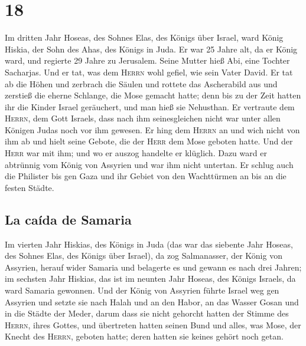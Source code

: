 \hypertarget{section-17}{%
\section{18}\label{section-17}}

 Im dritten Jahr Hoseas, des Sohnes Elas, des Königs über
Israel, ward König Hiskia, der Sohn des Ahas, des Königs in Juda.
 Er war 25 Jahre alt, da er König ward, und regierte 29
Jahre zu Jerusalem. Seine Mutter hieß Abi, eine Tochter Sacharjas.
 Und er tat, was dem \textsc{Herrn} wohl gefiel, wie sein
Vater David.  Er tat ab die Höhen und zerbrach die Säulen
und rottete das Ascherabild aus und zerstieß die eherne Schlange, die
Mose gemacht hatte; denn bis zu der Zeit hatten ihr die Kinder Israel
geräuchert, und man hieß sie Nehusthan.  Er vertraute dem
\textsc{Herrn}, dem Gott Israels, dass nach ihm seinesgleichen nicht war
unter allen Königen Judas noch vor ihm gewesen.  Er hing
dem \textsc{Herrn} an und wich nicht von ihm ab und hielt seine Gebote,
die der \textsc{Herr} dem Mose geboten hatte.  Und der
\textsc{Herr} war mit ihm; und wo er auszog handelte er klüglich. Dazu
ward er abtrünnig vom König von Assyrien und war ihm nicht untertan.
 Er schlug auch die Philister bis gen Gaza und ihr Gebiet
von den Wachttürmen an bis an die festen Städte.

\hypertarget{la-cauxedda-de-samaria}{%
\subsection{La caída de Samaria}\label{la-cauxedda-de-samaria}}

 Im vierten Jahr Hiskias, des Königs in Juda (das war das
siebente Jahr Hoseas, des Sohnes Elas, des Königs über Israel), da zog
Salmanasser, der König von Assyrien, herauf wider Samaria und belagerte
es  und gewann es nach drei Jahren; im sechsten Jahr
Hiskias, das ist im neunten Jahr Hoseas, des Königs Israels, da ward
Samaria gewonnen.  Und der König von Assyrien führte
Israel weg gen Assyrien und setzte sie nach Halah und an den Habor, an
das Wasser Gosan und in die Städte der Meder,  darum dass
sie nicht gehorcht hatten der Stimme des \textsc{Herrn}, ihres Gottes,
und übertreten hatten seinen Bund und alles, was Mose, der Knecht des
\textsc{Herrn}, geboten hatte; deren hatten sie keines gehört noch
getan.

